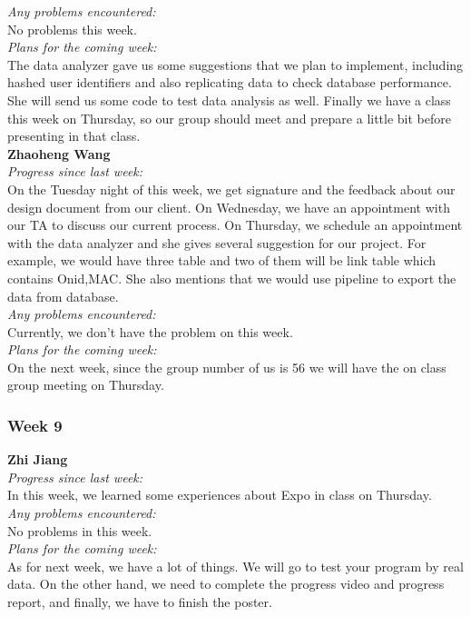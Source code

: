 \noindent\textit{Any problems encountered:}\\
No problems this week.\\

\noindent\textit{Plans for the coming week:}\\
The data analyzer gave us some suggestions that we plan to implement, including hashed user identifiers and also replicating data to check database performance. She will send us some code to test data analysis as well. Finally we have a class this week on Thursday, so our group should meet and prepare a little bit before presenting in that class.\\

\noindent\textbf{Zhaoheng Wang}\\
\noindent\textit{Progress since last week:}\\
On the Tuesday night of this week, we get signature and the feedback about our design document from our client. On Wednesday, we have an appointment with our TA to discuss our current process. On Thursday, we schedule an appointment with the data analyzer and she gives several suggestion for our project. For example, we would have three table and two of them will be link table which contains Onid,MAC. She also mentions that we would use pipeline to export the data from database.\\

\noindent\textit{Any problems encountered:}\\
Currently, we don't have the problem on this week.\\

\noindent\textit{Plans for the coming week:}\\
On the next week, since the group number of us is 56 we will have the on class group meeting on Thursday.

\subsubsection{Week 9}
\textbf{Zhi Jiang}\\
\noindent\textit{Progress since last week:}\\
In this week, we learned some experiences about Expo in class on Thursday.\\

\noindent\textit{Any problems encountered:}\\
No problems in this week.\\

\noindent\textit{Plans for the coming week:}\\
As for next week, we have a lot of things. We will go to test your program by real data. On the other hand, we need to complete the progress video and progress report, and finally, we have to finish the poster.\\

